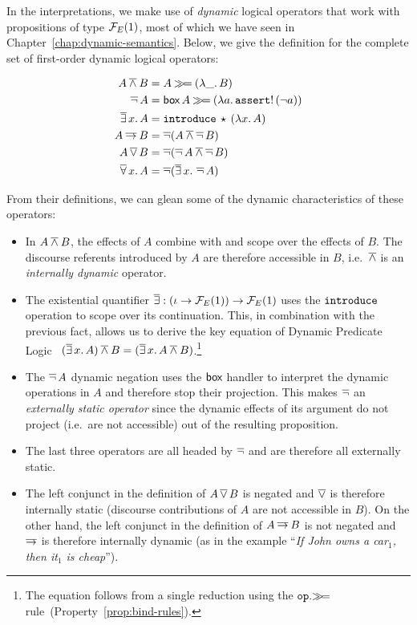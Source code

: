 In the interpretations, we make use of \emph{dynamic} logical operators
that work with propositions of type $\mathcal{F}_E(1)$, most of which we have seen
in Chapter~\ref{chap:dynamic-semantics}. Below, we give the definition for
the complete set of first-order dynamic logical operators:

\begin{align*}
  A \mathbin{\overline{\land}} B &= A \mathbin{\gg\!=} (\lambda \_.\, B) \\
  \mathop{\overline{\lnot}} A &= \textsf{box}\,A \mathbin{\gg\!=} (\lambda a.\, \mathtt{assert}!\,(\lnot a)) \\
  \mathop{\overline{\exists}} x.\,A &= \mathtt{introduce}\,\star\,(\lambda x.\, A) \\
  A \mathbin{\overline{\to}} B &= \mathop{\overline{\lnot}} (A \mathbin{\overline{\land}} \mathop{\overline{\lnot}} B) \\
  A \mathop{\overline{\lor}} B &= \mathop{\overline{\lnot}} (\mathop{\overline{\lnot}} A \mathbin{\overline{\land}} \mathop{\overline{\lnot}} B) \\
  \mathop{\overline{\forall}} x.\,A &= \mathop{\overline{\lnot}} (\mathop{\overline{\exists}} x.\,\mathop{\overline{\lnot}} A)
\end{align*}

From their definitions, we can glean some of the dynamic characteristics of
these operators:

\begin{itemize}
\item In $A \mathbin{\overline{\land}} B$, the effects of $A$ combine with and scope over the
  effects of $B$. The discourse referents introduced by $A$ are therefore
  accessible in $B$, i.e.\ $\mathbin{\overline{\land}}$ is an \emph{internally dynamic}
  operator.
\item The existential quantifier
  $\mathop{\overline{\exists}} : (\iota \to \mathcal{F}_E(1)) \to \mathcal{F}_E(1)$ uses the $\mathtt{introduce}$
  operation to scope over its continuation. This, in combination with the
  previous fact, allows us to derive the key equation of Dynamic Predicate
  Logic~\cite{groenendijk1991dynamic}
  $(\mathop{\overline{\exists}} x.\,A) \mathbin{\overline{\land}} B = (\mathop{\overline{\exists}} x.\,A \mathbin{\overline{\land}} B)$.\footnote{The
    equation follows from a single reduction using the $\mathtt{op}.\mathbin{\gg\!=}$
    rule~(Property~\ref{prop:bind-rules}).}
\item The $\mathop{\overline{\lnot}} A$ dynamic negation uses the $\textsf{box}$ handler to interpret
  the dynamic operations in $A$ and therefore stop their projection. This
  makes $\mathop{\overline{\lnot}}$ an \emph{externally static operator} since the dynamic
  effects of its argument do not project (i.e.\ are not accessible) out of
  the resulting proposition.
\item The last three operators are all headed by $\mathop{\overline{\lnot}}$ and are therefore
  all externally static.
\item The left conjunct in the definition of $A \mathop{\overline{\lor}} B$ is negated and
  $\mathop{\overline{\lor}}$ is therefore internally static (discourse contributions of $A$ are
  not accessible in $B$). On the other hand, the left conjunct in the
  definition of $A \mathbin{\overline{\to}} B$ is not negated and $\mathbin{\overline{\to}}$ is therefore
  internally dynamic (as in the example ``\emph{If John owns a car$_1$,
    then it$_1$ is cheap}'').
\end{itemize}

